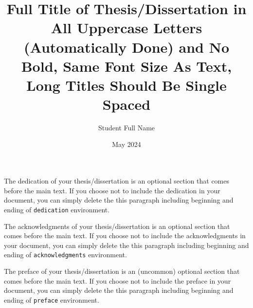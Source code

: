 \documentclass[master,nosecnum,nohyphenation,pdfonly,boundcover]{uofm}
\title{Full Title of Thesis/Dissertation in All Uppercase Letters (Automatically Done) and No Bold, Same Font Size As Text, Long Titles Should Be Single Spaced}
\author{Student Full Name}
\date{May 2024}
\begin{document}
\maketitle

\frontmatter

\copyrightpage %

\begin{dedication} %
    The dedication of your thesis/dissertation is an optional section that comes before the main text. If you choose not to include the dedication in your document, you can simply delete the this paragraph including beginning and ending of \verb|dedication| environment.
\end{dedication}

\begin{acknowledgments} %
    The acknowledgments of your thesis/dissertation is an optional section that comes before the main text. If you choose not to include the acknowledgments in your document, you can simply delete the this paragraph including beginning and ending of \verb|acknowledgments| environment.
\end{acknowledgments}

\begin{preface} %
    The preface of your thesis/dissertation is an (uncommon) optional section that comes before the main text. If you choose not to include the preface in your document, you can simply delete the this paragraph including beginning and ending of \verb|preface| environment.
\end{preface}
\end{document}
